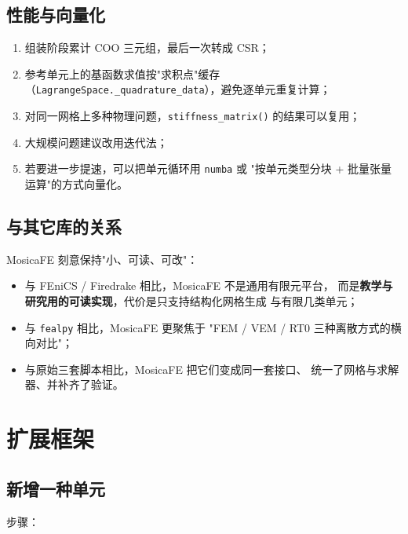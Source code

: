 \documentclass[UTF8,11pt,oneside]{ctexbook}
\theoremstyle{definition}
\theoremstyle{plain}
\newcommand{\mosica}{\textsf{MosicaFE}}
\newcommand{\code}[1]{\texttt{#1}}
\begin{document}
\section{性能与向量化}

\begin{enumerate}[label=(\arabic*),itemsep=0.2em]
  \item 组装阶段累计 COO 三元组，最后一次转成 CSR；
  \item 参考单元上的基函数求值按"求积点"缓存
        （\code{LagrangeSpace.\_\allowbreak quadrature\_\allowbreak data}），避免逐单元重复计算；
  \item 对同一网格上多种物理问题，\code{stiffness\_\allowbreak matrix()} 的结果可以复用；
  \item 大规模问题建议改用迭代法；
  \item 若要进一步提速，可以把单元循环用 \code{numba} 或
        "按单元类型分块 + 批量张量运算"的方式向量化。
\end{enumerate}

\section{与其它库的关系}

\mosica{} 刻意保持"小、可读、可改"：

\begin{itemize}[itemsep=0.2em]
  \item 与 FEniCS / Firedrake 相比，\mosica{} 不是通用有限元平台，
        而是\textbf{教学与研究用的可读实现}，代价是只支持结构化网格生成
        与有限几类单元；
  \item 与 \code{fealpy} 相比，\mosica{} 更聚焦于
        "FEM / VEM / RT0 三种离散方式的横向对比"；
  \item 与原始三套脚本相比，\mosica{} 把它们变成同一套接口、
        统一了网格与求解器、并补齐了验证。
\end{itemize}

\chapter{扩展框架}
\label{chap:extend}

\section{新增一种单元}

步骤：
\end{document}
